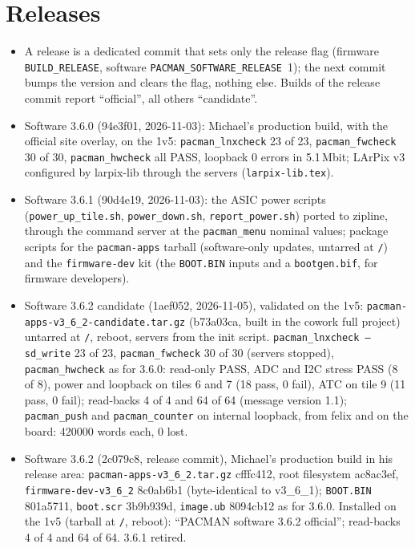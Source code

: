 \documentclass[11pt]{article}
\newcommand{\h}[1]{\texttt{#1}}
\begin{document}
\section{Releases}

\begin{itemize}
\item A release is a dedicated commit that sets only the release flag (firmware \h{BUILD\_RELEASE},
  software \h{PACMAN\_SOFTWARE\_RELEASE}~1); the next commit bumps the version and clears the flag, nothing else.
  Builds of the release commit report ``official'', all others ``candidate''.
\item Software 3.6.0 (94e3f01, 2026-11-03): Michael's production build, with the official site overlay, on the 1v5:
  \h{pacman\_lnxcheck} 23 of 23, \h{pacman\_fwcheck} 30 of 30, \h{pacman\_hwcheck} all PASS, loopback 0 errors in
  5.1\,Mbit; LArPix v3 configured by larpix-lib through the servers (\h{larpix-lib.tex}).
\item Software 3.6.1 (90d4e19, 2026-11-03): the ASIC power scripts (\h{power\_up\_tile.sh}, \h{power\_down.sh},
  \h{report\_power.sh}) ported to zipline, through the command server at the \h{pacman\_menu} nominal values;
  package scripts for the \h{pacman-apps} tarball (software-only updates, untarred at \h{/}) and the
  \h{firmware-dev} kit (the \h{BOOT.BIN} inputs and a \h{bootgen.bif}, for firmware developers).
\item Software 3.6.2 candidate (1aef052, 2026-11-05), validated on the 1v5:  \h{pacman-apps-v3\_6\_2-candidate.tar.gz}
  (b73a03ca, built in the cowork full project) untarred at \h{/}, reboot, servers from the init script.
  \h{pacman\_lnxcheck --sd\_write} 23 of 23, \h{pacman\_fwcheck} 30 of 30 (servers stopped), \h{pacman\_hwcheck}
  as for 3.6.0:  read-only PASS, ADC and I2C stress PASS (8 of 8), power and loopback on tiles 6 and 7 (18 pass, 0 fail),
  ATC on tile 9 (11 pass, 0 fail);  read-backs 4 of 4 and 64 of 64 (message version 1.1);  \h{pacman\_push} and
  \h{pacman\_counter} on internal loopback, from felix and on the board:  420000 words each, 0 lost.
\item Software 3.6.2 (2c079c8, release commit), Michael's production build in his release area:
  \h{pacman-apps-v3\_6\_2.tar.gz} cfffc412, root filesystem ac8ac3ef, \h{firmware-dev-v3\_6\_2} 8c0ab6b1 (byte-identical
  to v3\_6\_1);  \h{BOOT.BIN} 801a5711, \h{boot.scr} 3b9b939d, \h{image.ub} 8094cb12 as for 3.6.0.  Installed on the 1v5
  (tarball at \h{/}, reboot):  ``PACMAN software 3.6.2 official'';  read-backs 4 of 4 and 64 of 64.  3.6.1 retired.

\end{itemize}
\end{document}
